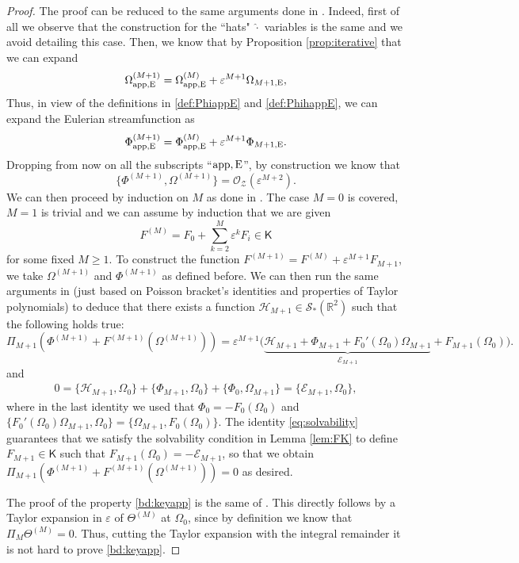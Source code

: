 \documentclass[11pt,reqno,a4paper]{amsart}
\def\eps{\varepsilon}
\def\RR {\mathbb{R}}
\newcommand{\cE}{\mathcal{E}}
\newcommand{\cH}{\mathcal{H}}
\newcommand{\cO}{\mathcal{O}}
\newcommand{\cS}{\mathcal{S}}
\newcommand{\cZ}{\mathcal{Z}}
\newcommand{\1}{\mathbbm{1}}
\theoremstyle{definition}
\theoremstyle{definition}
\numberwithin{equation}{section}
\newcommand{\Mappp}[3]{#1^{(#2)}_\mathrm{app,#3}}
\begin{document}
\begin{proof}
    The proof can be reduced to the same arguments done in \cite[Proof of Proposition 3.20]{dolce2024long}. Indeed, first of all we observe that the construction for the ``hats" $\widehat{\cdot}$ variables is the same and we avoid detailing this case. Then, we know that by Proposition \ref{prop:iterative} that we can expand
    \begin{equation}
\Mappp{\Omega}{M+1}{E}=\Mappp{\Omega}{M}{E}+\eps^{M+1}{\Omega}_{M+1,{\rm E}},
    \end{equation}
    Thus, in view of the definitions in \cref{def:PhiappE} and \cref{def:PhihappE}, we can expand the Eulerian streamfunction as 
    \begin{equation}
        \Mappp{\Phi}{M+1}{E}=\Mappp{\Phi}{M}{E}+\eps^{M+1}\Phi_{M+1,{\rm E}}.
    \end{equation}
  Dropping from now on all the subscripts ``$\rm app, E$'', by construction  we know that 
    \begin{equation}
        \{\Phi^{(M+1)},\Omega^{(M+1)}\}=\cO_{\cZ}(\eps^{M+2}).
    \end{equation}
    We can then proceed by induction on $M$ as done in \cite[Proof of Proposition 3.20]{dolce2024long}. The case $M=0$ is covered, $M=1$ is trivial and we can assume by induction that we are given $$F^{(M)}=F_0+\sum_{k=2}^M\eps^k F_i\in \mathsf{K}$$ for some fixed $M\geq 1$. To construct the function $F^{(M+1)}=F^{(M)}+\eps^{M+1}F_{M+1}$, we take $\Omega^{(M+1)}$ and $\Phi^{(M+1)}$  as defined before. We can then run the same arguments in \cite{dolce2024long} (just based on Poisson bracket's identities and properties of Taylor polynomials) to deduce that there exists a function $\cH_{M+1}\in \cS_{*}(\RR^2)$ such that the following holds true:
    \begin{equation}
        \Pi_{M+1}(\Phi^{(M+1)}+F^{(M+1)}(\Omega^{(M+1)}))=\eps^{M+1}\big(\underbrace{\cH_{M+1}+\Phi_{M+1}+F_0'(\Omega_0)\Omega_{M+1}}_{\cE_{M+1}}+F_{M+1}(\Omega_0)\big).
    \end{equation}
    and
    \begin{align}
    \label{eq:solvability}
        0=\{\cH_{M+1},\Omega_0\}+\{\Phi_{M+1},\Omega_0\}+\{\Phi_0,\Omega_{M+1}\}=\{\cE_{M+1},\Omega_0\},
    \end{align}
    where in the last identity we used that $\Phi_0=-F_0(\Omega_0)$ and $\{F_0'(\Omega_0)\Omega_{M+1},\Omega_0\}=\{\Omega_{M+1},F_0(\Omega_0)\}.$
    The identity \cref{eq:solvability} guarantees that we satisfy the solvability condition in Lemma \ref{lem:FK} to define $F_{M+1}\in\mathsf{K}$ such that $F_{M+1}(\Omega_0)=-\cE_{M+1}$, so that we obtain $\Pi_{M+1}(\Phi^{(M+1)}+F^{(M+1)}(\Omega^{(M+1)}))=0$ as desired.

    The proof of the property \cref{bd:keyapp} is the same of \cite{dolce2024long}. This directly follows by a Taylor expansion in $\eps$ of $\Theta^{(M)}$ at $\Omega_0$, since by definition we know that $\Pi_M \Theta^{(M)}=0$. Thus, cutting the Taylor expansion with the integral remainder it is not hard to prove \cref{bd:keyapp}.
\end{proof}
\end{document}
